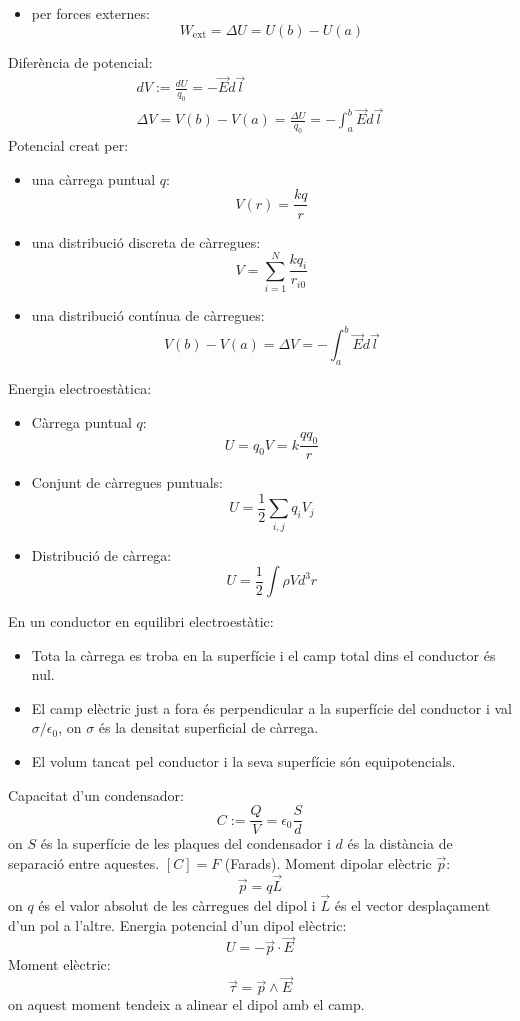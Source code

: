 \documentclass[../../../main.tex]{subfiles}
\begin{document}
\begin{multicols}{2}
\begin{itemize}
    \item per forces externes: $$W_{\text{ext}}=\Delta U=U(b)-U(a)$$
\end{itemize}
Diferència de potencial:
\begin{gather*}
    dV:=\frac{dU}{q_0}=-\Vec{E}d\Vec{l}\\
    \Delta V=V(b)-V(a)=\frac{\Delta U}{q_0}=-\int_a^b\Vec{E}d\Vec{l}
\end{gather*}
Potencial creat per:
\begin{itemize}
    \item una càrrega puntual $q$: $$V(r)=\frac{kq}{r}$$
    \item una distribució discreta de càrregues: $$V=\sum_{i=1}^N\frac{kq_i}{r_{i0}}$$
    \item una distribució contínua de càrregues:
    $$V(b)-V(a)=\Delta V=-\int_a^b\Vec{E}d\Vec{l}$$
\end{itemize}
Energia electroestàtica:
\begin{itemize}
    \item Càrrega puntual $q$:$$U=q_0V=k\frac{qq_0}{r}$$
    \item Conjunt de càrregues puntuals: $$U=\frac{1}{2}\sum_{i,j}q_iV_j$$
    \item Distribució de càrrega:
    $$U=\frac{1}{2}\int\rho V d^3r$$
\end{itemize}
En un conductor en equilibri electroestàtic:
\begin{itemize}
    \item Tota la càrrega es troba en la superfície i el camp total dins el conductor és nul.
    \item El camp elèctric just a fora és per\-pen\-di\-cu\-lar a la superfície del conductor i val $\sigma/\epsilon_0$, on $\sigma$ és la densitat superficial de càrrega.
    \item El volum tancat pel conductor i la seva superfície són equipotencials.
\end{itemize}
Capacitat d'un condensador: $$C:=\frac{Q}{V}=\epsilon_0\frac{S}{d}$$ {on $S$ és la superfície de les plaques del condensador i $d$ és la distància de separació entre aquestes. $[C]=F$ (Farads).}\newline
Moment dipolar elèctric $\Vec{p}$: $$\Vec{p}=q\Vec{L}$$ {on $q$ és el valor absolut de les càrregues del dipol i $\Vec{L}$ és el vector desplaçament d'un pol a l'altre.}\newline
Energia potencial d'un dipol elèctric: $$U=-\Vec{p}\cdot\Vec{E}$$
Moment elèctric: $$\Vec{\tau}=\Vec{p}\wedge\Vec{E}$$ {on aquest moment tendeix a alinear el dipol amb el camp.}\newline

\end{multicols}
\end{document}
